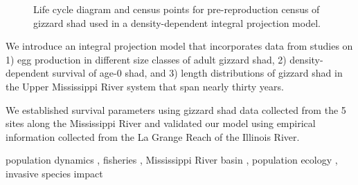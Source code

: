 \documentclass[preprint,review,12pt,authoryear]{elsarticle}
\begin{document}
\begin{frontmatter}
\begin{graphicalabstract}
\begin{figure}
\begin{center}
\end{center}
 \caption{\small{Life cycle diagram and census points for pre-reproduction census of gizzard shad used in a density-dependent integral projection model.}}
\end{figure}

\end{graphicalabstract}

\begin{highlights}
\item We introduce an integral projection model that incorporates data from studies on 1) egg production in different size classes of adult gizzard shad, 2) density-dependent survival of age-0 shad, and 3) length distributions of gizzard shad in the Upper Mississippi River system that span nearly thirty years.
\item  We established survival parameters using gizzard shad data collected from the 5 sites along the Mississippi River and validated our model using empirical information collected from the La Grange Reach of the Illinois River.
\end{highlights}

\begin{keyword}
  population dynamics \sep
  fisheries \sep
  Mississippi River basin \sep
  population ecology \sep
  invasive species impact 



\end{keyword}

\end{frontmatter}


\end{document}
